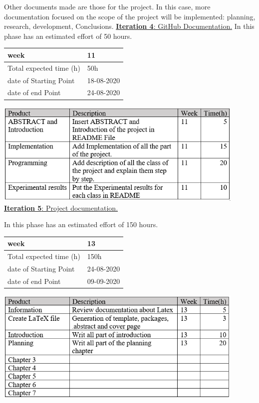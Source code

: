 Other documents made are those for the project. In this case, more documentation focused on the scope of the project will be implemented: planning, research, development, Conclusions.
\newpage
\large{\underline{\textbf{Iteration 4}: GitHub Documentation.}}
In this phase has an estimated effort of 50 hours.

\begin{table}[h!]
    \centering
    \begin{tabular}{|p{5cm}|p{4cm}|}
     \hline
        \cellcolor[gray]{0.9} week  & 11\\ \hline
        \cellcolor[gray]{0.9} Total expected time (h)  & 50h \\ \hline
        \cellcolor[gray]{0.9} date of Starting Point  & 18-08-2020 \\ \hline
        \cellcolor[gray]{0.9} date of end Point  & 24-08-2020 \\ \hline
            
\end{tabular}
\end{table}

\includegraphics[width=0.9\textwidth]{imagenes/it4.png}\\[1.4cm]

\large{\underline{\textbf{Iteration 5}: Project documentation.}}

In this phase has an estimated effort of 150 hours.

\begin{table}[h!]
    \centering
    \begin{tabular}{|p{5cm}|p{4cm}|}
     \hline
        \cellcolor[gray]{0.9} week  & 13\\ \hline
        \cellcolor[gray]{0.9} Total expected time (h)  & 150h \\ \hline
        \cellcolor[gray]{0.9} date of Starting Point  & 24-08-2020 \\ \hline
        \cellcolor[gray]{0.9} date of end Point  & 09-09-2020 \\ \hline
            
\end{tabular}
\end{table}

\includegraphics[width=0.9\textwidth]{imagenes/it5.png}\\[1.4cm]
